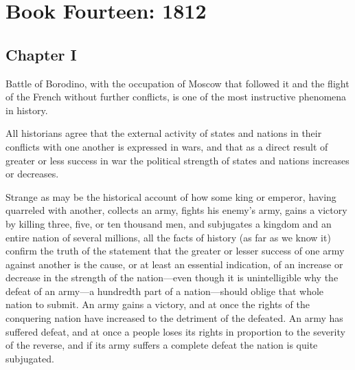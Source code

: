 \part*{Book Fourteen: 1812}


\chapter*{Chapter I} \ifaudio {}
\fi

 Battle of Borodino, with the occupation of Moscow that
followed it and the flight of the French without further
conflicts, is one of the most instructive phenomena in history.

All historians agree that the external activity of states and
nations in their conflicts with one another is expressed in wars,
and that as a direct result of greater or less success in war the
political strength of states and nations increases or decreases.

Strange as may be the historical account of how some king or
emperor, having quarreled with another, collects an army, fights
his enemy's army, gains a victory by killing three, five, or ten
thousand men, and subjugates a kingdom and an entire nation of
several millions, all the facts of history (as far as we know it)
confirm the truth of the statement that the greater or lesser
success of one army against another is the cause, or at least an
essential indication, of an increase or decrease in the strength
of the nation---even though it is unintelligible why the defeat
of an army---a hundredth part of a nation---should oblige that
whole nation to submit. An army gains a victory, and at once the
rights of the conquering nation have increased to the detriment
of the defeated. An army has suffered defeat, and at once a
people loses its rights in proportion to the severity of the
reverse, and if its army suffers a complete defeat the nation is
quite subjugated.

